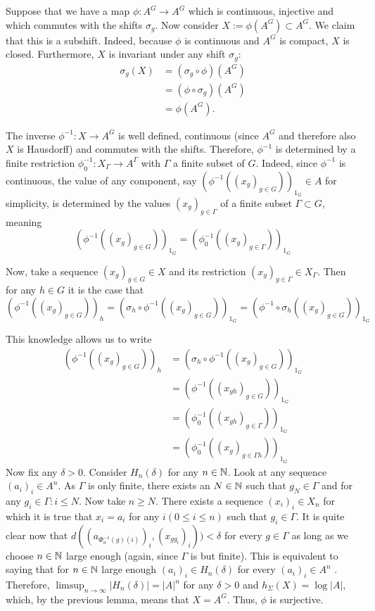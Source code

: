 Suppose that we have a map $\phi: A^G \to A^G$ which is continuous, injective and which commutes with the shifts $\sigma_g$. Now consider $X := \phi(A^G) \subset A^G$. We claim that this is a subshift. Indeed, because $\phi$ is continuous and $A^G$ is compact, $X$ is closed. Furthermore, $X$ is invariant under any shift $\sigma_g$: 
		\begin{align*}
		\sigma_g(X)
		&= (\sigma_g \circ \phi) (A^G) \\
		&= (\phi \circ \sigma_g)(A^G) \\
		&= \phi(A^G).
		\end{align*}
		
The inverse $\phi^{-1}: X \to A^G$ is well defined, continuous (since $A^G$ and therefore also $X$ is Hausdorff) and commutes with the shifts. Therefore,  $\phi^{-1}$ is determined by a finite restriction $\phi^{-1}_0: X_{\Gamma} \to A^{\Gamma}$ with $\Gamma$ a finite subset of $G$. Indeed, since $\phi^{-1}$ is continuous, the value of any component, say $(\phi^{-1}((x_g)_{g \in G}))_{1_G} \in A$ for simplicity, is determined by the values $(x_g)_{g \in \Gamma}$ of a finite subset $\Gamma \subset G$, meaning 
		\[
		(\phi^{-1}((x_g)_{g \in G}))_{1_G} = (\phi^{-1}_0((x_g)_{g \in \Gamma}))_{1_G}
		\]

Now, take a sequence $(x_g)_{g \in G} \in X$ and its restriction $(x_g)_{g \in \Gamma} \in X_{\Gamma}$. Then for any $h \in G$ it is the case that 
		\[
		(\phi^{-1}((x_g)_{g \in G}))_h = (\sigma_h \circ \phi^{-1}((x_g)_{g \in G}))_{1_G}  = (\phi^{-1} \circ \sigma_h((x_g)_{g \in G}))_{1_G}
		\]

This knowledge allows us to write
		\begin{align*}
		(\phi^{-1}((x_g)_{g \in G}))_h
		&= (\sigma_h \circ \phi^{-1}((x_g)_{g \in G}))_{1_G} \\
		&= (\phi^{-1}((x_{gh})_{g \in G}))_{1_G} \\
		&= (\phi^{-1}_0((x_{gh})_{g \in \Gamma}))_{1_G} \\
		&= (\phi^{-1}_0((x_g)_{g \in \Gamma h}))_{1_G}
		\end{align*}
Now fix any $\delta > 0$. Consider $H_n(\delta)$ for any $n \in \mathbb{N}$. Look at any sequence $(a_i)_i \in A^n$. As $\Gamma$ is only finite, there exists an $N \in \mathbb{N}$ such that $g_N \in \Gamma$ and for any $g_i \in \Gamma: i \leq N$. Now take $n \geq N$. There exists a sequence $(x_i)_i \in X_n$ for which it is true that $x_i = a_i$ for any $i(0 \leq i \leq n)$ such that $g_i \in \Gamma$. It is quite clear now that $d((a_{\Phi^{-1}_n(g)(i)})_i,(x_{g g_i })_i)) < \delta$ for every $g \in \Gamma$ as long as we choose $n \in \mathbb{N}$ large enough (again, since $\Gamma$ is but finite). This is equivalent to saying that for $n \in \mathbb{N}$ large enough $(a_i)_i \in H_n(\delta)$ for every $(a_i)_i \in A^n$ . Therefore, $\limsup_{n \to \infty} |H_n(\delta)| = |A|^{n}$ for any $\delta >0$ and $h_\Sigma(X) = \log |A|$, which, by the previous lemma, means that $X = A^G$. Thus, $\phi$ is surjective.

